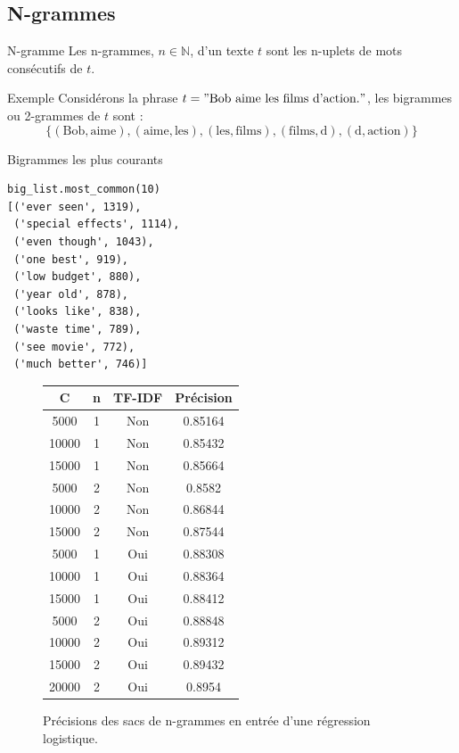 \documentclass{beamer}
\begin{document}
\subsection{N-grammes}

\begin{frame}
\begin{block}{N-gramme}
Les n-grammes, $n \in \mathbb{N}$, d'un texte $t$ sont les n-uplets de mots consécutifs de $t$.
\end{block}

\begin{block}{Exemple}
Considérons la phrase $t="\text{Bob aime les films d'action.}"$, les bigrammes ou 2-grammes de $t$ sont :
$$
\{(\text{Bob}, \text{aime}), (\text{aime}, \text{les}), (\text{les}, \text{films}), (\text{films}, \text{d}), (\text{d}, \text{action})\}
$$
\end{block}
\end{frame}

\begin{frame}[containsverbatim]{Bigrammes les plus courants}
\begin{verbatim}
big_list.most_common(10)
[('ever seen', 1319),
 ('special effects', 1114),
 ('even though', 1043),
 ('one best', 919),
 ('low budget', 880),
 ('year old', 878),
 ('looks like', 838),
 ('waste time', 789),
 ('see movie', 772),
 ('much better', 746)]
\end{verbatim}
\end{frame}

\begin{frame}
\begin{figure}
\begin{center}
\begin{tabular}{|c|c|c|c|}
	\hline
	C & n & TF-IDF & Précision \\
	\hline
	5000 & 1 & Non & 0.85164 \\
	\hline
	10000 & 1 & Non & 0.85432 \\
	\hline
	15000 & 1 & Non & 0.85664 \\
	\hline
	\hline
	5000 & 2 & Non & 0.8582 \\
	\hline
	10000 & 2 & Non & 0.86844 \\
	\hline
	15000 & 2 & Non & 0.87544 \\
	\hline
	\hline
	5000 & 1 & Oui & 0.88308 \\
	\hline
	10000 & 1 & Oui & 0.88364 \\
	\hline
	15000 & 1 & Oui & 0.88412 \\
	\hline
	\hline
	5000 & 2 & Oui & 0.88848 \\
	\hline
	10000 & 2 & Oui & 0.89312 \\
	\hline
	15000 & 2 & Oui & 0.89432 \\
	\hline
	20000 & 2 & Oui & 0.8954 \\
	\hline
\end{tabular}
\caption{Précisions des sacs de n-grammes en entrée d'une régression logistique.}
\end{center}
\end{figure}
\end{frame}
\end{document}
